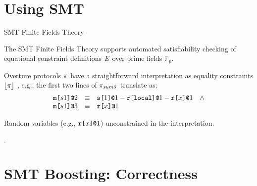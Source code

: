 \documentclass{beamer}
\begin{document}
\section{Using SMT}

\begin{frame}{SMT Finite Fields Theory}

  The SMT Finite Fields Theory supports automated satisfiability checking of equational
  constraint definitions $\mathit{E}$ over prime fields $\mathbb{F}_{p}$.

  \medskip
  
  Overture protocols $\pi$ have a straightforward interpretation as equality constraints $\lfloor \pi \rfloor$ , e.g.,
  the first two lines of $\pi_{\mathit{sum3}}$ translate as:
  $$
    \begin{array}{lll}
      \texttt{m[}s1\texttt{]}\texttt{@}2 &\equiv& \texttt{s[}1\texttt{]}\texttt{@}1 - \texttt{r[}\mathtt{local}\texttt{]}\texttt{@}1 - \texttt{r[}x\texttt{]}\texttt{@}1\quad \wedge \\ 
      \texttt{m[}s1\texttt{]}\texttt{@}3 &\equiv& \texttt{r[}x\texttt{]}\texttt{@}1 
    \end{array}
  $$

    Random variables (e.g., $\texttt{r[}x\texttt{]}\texttt{@}1$) unconstrained in the interpretation.

    \medskip
    
    .
    
  
\end{frame}

\section{SMT Boosting: Correctness}
\end{document}

